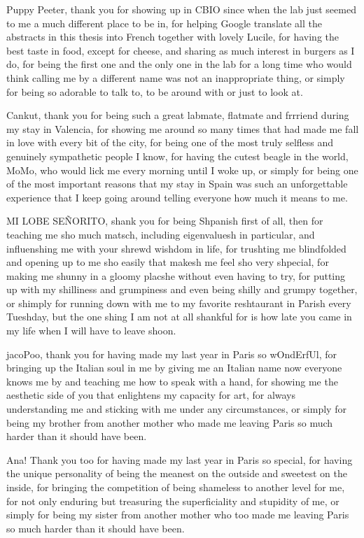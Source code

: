 Puppy Peeter, thank you for showing up in CBIO since when the lab just seemed to me a much different place to be in, for helping Google translate all the abstracts in this thesis into French together with lovely Lucile, for having the best taste in food, except for cheese, and sharing as much interest in burgers as I do, for being the first one and the only one in the lab for a long time who would think calling me by a different name was not an inappropriate thing, or simply for being so adorable to talk to, to be around with or just to look at.


Cankut, thank you for being such a great labmate, flatmate and frrriend during my stay in Valencia, for showing me around so many times that had made me fall in love with every bit of the city, for being one of the most truly selfless and genuinely sympathetic people I know, for having the cutest beagle in the world, MoMo, who would lick me every morning until I woke up, or simply for being one of the most important reasons that my stay in Spain was such an unforgettable experience that I keep going around telling everyone how much it means to me.


MI LOBE SE\~{N}ORITO, shank you for being Shpanish first of all, then for teaching me sho much matsch, including eigenvaluesh in particular, and influenshing me with your shrewd wishdom in life, for trushting me blindfolded and opening up to me sho easily that makesh me feel sho very shpecial, for making me shunny in a gloomy placshe without even having to try, for putting up with my shilliness and grumpiness and even being shilly and grumpy together, or shimply for running down with me to my favorite reshtaurant in Parish every Tueshday, but the one shing I am not at all shankful for is how late you came in my life when I will have to leave shoon.


jacoPoo, thank you for having made my last year in Paris so wOndErfUl, for bringing up the Italian soul in me by giving me an Italian name now everyone knows me by and teaching me how to speak with a hand, for showing me the aesthetic side of you that enlightens my capacity for art, for always understanding me and sticking with me under any circumstances, or simply for being my brother from another mother who made me leaving Paris so much harder than it should have been.


Ana! Thank you too for having made my last year in Paris so special, for having the unique personality of being the meanest on the outside and sweetest on the inside, for bringing the competition of being shameless to another level for me, for not only enduring but treasuring the superficiality and stupidity of me, or simply for being my sister from another mother who too made me leaving Paris so much harder than it should have been.


